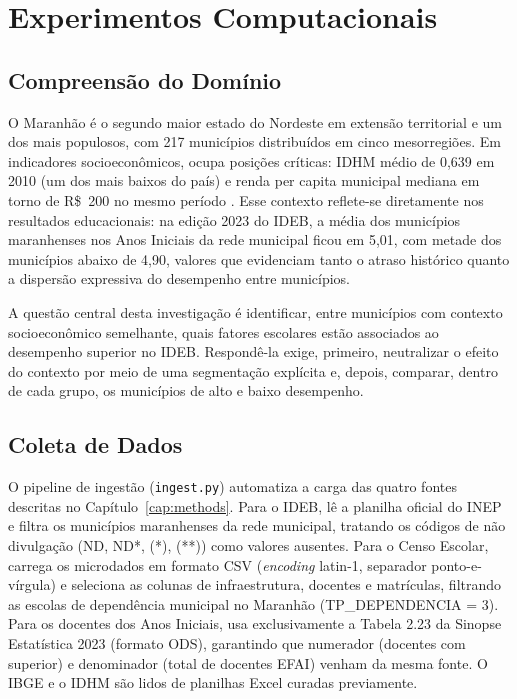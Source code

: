 \chapter{Experimentos Computacionais}
\label{cap:experiments}

\section{Compreensão do Domínio}

O Maranhão é o segundo maior estado do Nordeste em extensão territorial e um dos mais populosos, com 217 municípios distribuídos em cinco mesorregiões. Em indicadores socioeconômicos, ocupa posições críticas: IDHM médio de 0,639 em 2010 (um dos mais baixos do país) e renda per capita municipal mediana em torno de R\$~200 no mesmo período \cite{ibge2010}. Esse contexto reflete-se diretamente nos resultados educacionais: na edição 2023 do IDEB, a média dos municípios maranhenses nos Anos Iniciais da rede municipal ficou em 5,01, com metade dos municípios abaixo de 4,90, valores que evidenciam tanto o atraso histórico quanto a dispersão expressiva do desempenho entre municípios.

A questão central desta investigação é identificar, entre municípios com contexto socioeconômico semelhante, quais fatores escolares estão associados ao desempenho superior no IDEB. Respondê-la exige, primeiro, neutralizar o efeito do contexto por meio de uma segmentação explícita e, depois, comparar, dentro de cada grupo, os municípios de alto e baixo desempenho.

\section{Coleta de Dados}

O pipeline de ingestão (\texttt{ingest.py}) automatiza a carga das quatro fontes descritas no Capítulo~\ref{cap:methods}. Para o IDEB, lê a planilha oficial do INEP e filtra os municípios maranhenses da rede municipal, tratando os códigos de não divulgação (ND, ND*, (*), (**)) como valores ausentes. Para o Censo Escolar, carrega os microdados em formato CSV (\textit{encoding} latin-1, separador ponto-e-vírgula) e seleciona as colunas de infraestrutura, docentes e matrículas, filtrando as escolas de dependência municipal no Maranhão (TP\_DEPENDENCIA = 3). Para os docentes dos Anos Iniciais, usa exclusivamente a Tabela 2.23 da Sinopse Estatística 2023 (formato ODS), garantindo que numerador (docentes com superior) e denominador (total de docentes EFAI) venham da mesma fonte. O IBGE e o IDHM são lidos de planilhas Excel curadas previamente.

